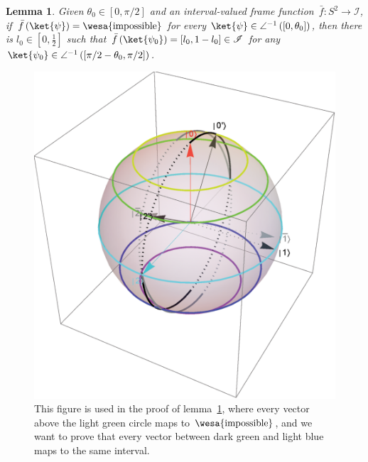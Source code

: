 \documentclass[12pt]{iopart}
\theoremstyle{plain}
\newtheorem{lemma}[thm]{Lemma}
\theoremstyle{definition}
\theoremstyle{remark}
\newcommand{\imposs}{{\mbox{\wesa{impossible}}}}
\begin{document}
\begin{lemma}\label{lemma:imposs-imply-same-value}Given
$\theta_{0}\in\left[0,\pi/2\right]$ and an interval-valued frame function~$\bar{f}:S^{2}\rightarrow\mathscr{I}$,
if $\bar{f}\left(\ket{\psi}\right)=\imposs$ for every $\ket{\psi}\in\angle^{-1}\left(\left[0,\theta_{0}\right]\right)$,
then there is $l_{0}\in\left[0,\frac{1}{2}\right]$ such that $\bar{f}\left(\ket{\psi_{0}}\right)=\left[l_{0},1-l_{0}\right]\in\mathscr{I}$
for any $\ket{\psi_{0}}\in\angle^{-1}\left(\left[\pi/2-\theta_{0},\pi/2\right]\right)$.\end{lemma}
\begin{figure}
\begin{centering}
\includegraphics[scale=0.38]{figureb1} 
\par\end{centering}
\caption{\label{fig:three-dimensional-real-frame-1}This figure is used in
the proof of lemma~\ref{lemma:imposs-imply-same-value}, where every
vector above the light green circle maps to $\imposs$, and we want
to prove that every vector between dark green and light blue maps
to the same interval.}
\end{figure}
\end{document}

